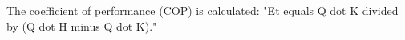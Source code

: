 The coefficient of performance (COP) is calculated:  
"Et equals Q dot K divided by (Q dot H minus Q dot K)."